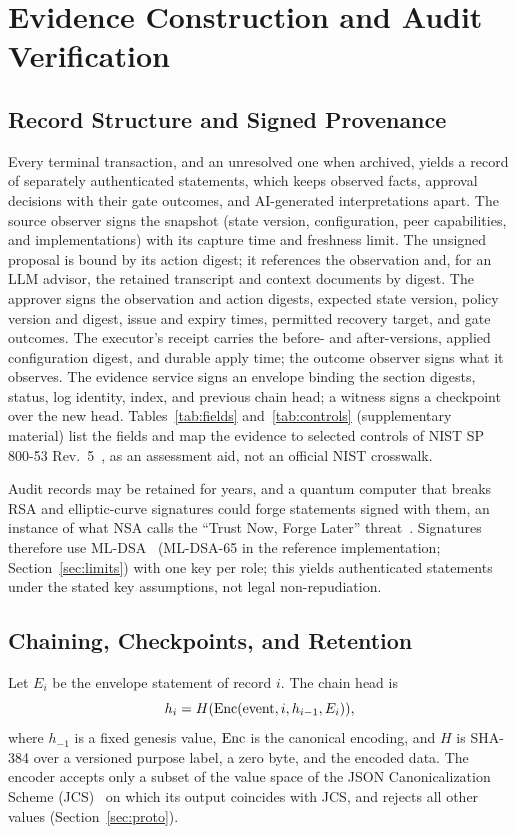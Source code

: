 \section{Evidence Construction and Audit Verification}
\label{sec:evidence}

\subsection{Record Structure and Signed Provenance}
Every terminal transaction, and an unresolved one when archived, yields a record of separately authenticated statements, which keeps observed facts, approval decisions with their gate outcomes, and AI-generated interpretations apart. The source observer signs the snapshot (state version, configuration, peer capabilities, and implementations) with its capture time and freshness limit. The unsigned proposal is bound by its action digest; it references the observation and, for an LLM advisor, the retained transcript and context documents by digest. The approver signs the observation and action digests, expected state version, policy version and digest, issue and expiry times, permitted recovery target, and gate outcomes. The executor's receipt carries the before- and after-versions, applied configuration digest, and durable apply time; the outcome observer signs what it observes. The evidence service signs an envelope binding the section digests, status, log identity, index, and previous chain head; a witness signs a checkpoint over the new head. Tables~\ref{tab:fields} and~\ref{tab:controls} (supplementary material) list the fields and map the evidence to selected controls of NIST SP 800-53 Rev.~5~\cite{sp80053}, as an assessment aid, not an official NIST crosswalk.

Audit records may be retained for years, and a quantum computer that breaks RSA and elliptic-curve signatures could forge statements signed with them, an instance of what NSA calls the ``Trust Now, Forge Later'' threat~\cite{nsaarmor}. Signatures therefore use ML-DSA~\cite{fips204} (ML-DSA-65 in the reference implementation; Section~\ref{sec:limits}) with one key per role; this yields authenticated statements under the stated key assumptions, not legal non-repudiation.

\subsection{Chaining, Checkpoints, and Retention}
\label{sec:chain}
Let $E_i$ be the envelope statement of record $i$. The chain head is
\begin{equation}
\label{eq:chain}
h_i = H(\mathrm{Enc}(\text{event}, i, h_{i-1}, E_i)),
\end{equation}
where $h_{-1}$ is a fixed genesis value, $\mathrm{Enc}$ is the canonical encoding, and $H$ is SHA-384 over a versioned purpose label, a zero byte, and the encoded data. The encoder accepts only a subset of the value space of the JSON Canonicalization Scheme (JCS)~\cite{jcs} on which its output coincides with JCS, and rejects all other values (Section~\ref{sec:proto}).

